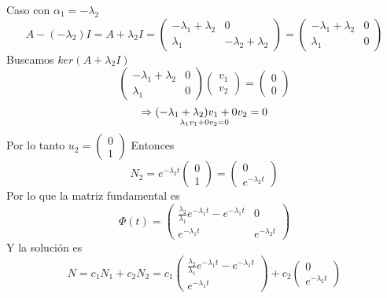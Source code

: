 Caso con $\alpha_{1}=-\lambda_{2}$
\begin{equation*}
     A - (-\lambda_{2}) I = A + \lambda_{2} I =
     \begin{pmatrix}
     -\lambda_{1}  +\lambda_{2} & 0 \\
    \lambda_{1} & -\lambda_{2} +\lambda_{2}
     \end{pmatrix}
     =
     \begin{pmatrix}
 -\lambda_{1} +\lambda_{2} & 0 \\
 \lambda_{1} & 0
     \end{pmatrix}
\end{equation*}
Buscamos $ker(A + \lambda_{2} I)$
\begin{equation*}
    \begin{pmatrix}
 -\lambda_{1} +\lambda_{2} & 0 \\
 \lambda_{1} & 0
     \end{pmatrix}
     \begin{pmatrix}
v_{1}   \\
v_{2}  
\end{pmatrix} =
\begin{pmatrix}
0   \\
0  
\end{pmatrix}
\end{equation*}
\begin{equation*}
    \Rightarrow  (-\lambda_{1} +\lambda_{2})v_{1}+ 0v_{2}=0 \atop
    \lambda_{1} v_{1} +0 v_{2} =0
\end{equation*}
Por lo tanto $u_{2}= 
\begin{pmatrix}
0 \\
1
\end{pmatrix}$
Entonces
\begin{equation*}
  N_{2}=e^{-\lambda_{2}t}  
\begin{pmatrix}
0 \\
1
\end{pmatrix}
=
\begin{pmatrix}
0 \\
e^{-\lambda_{2}t}
\end{pmatrix}
\end{equation*}
Por lo que la matriz fundamental es
\begin{equation*}
    \Phi(t)= 
    \begin{pmatrix}
    \frac{\lambda_{2}}{\lambda_{1}}e^{-\lambda_{1}t} - e^{-\lambda_{1}t} & 0 \\
    e^{-\lambda_{1}t} & e^{-\lambda_{2}t}
    \end{pmatrix}
\end{equation*}
Y la solución es 
\begin{equation}
     N=c_{1}N_{1} + c_{2}N_{2} =c_{1}\begin{pmatrix}
\frac{\lambda_{2}}{\lambda_{1}}e^{-\lambda_{1}t} - e^{-\lambda_{1}t} \\
e^{-\lambda_{1}t}
\end{pmatrix}  
+ c_{2}\begin{pmatrix}
0 \\
e^{-\lambda_{2}t}
\end{pmatrix}
\label{eq:soluciongeneralp5}
\end{equation}

